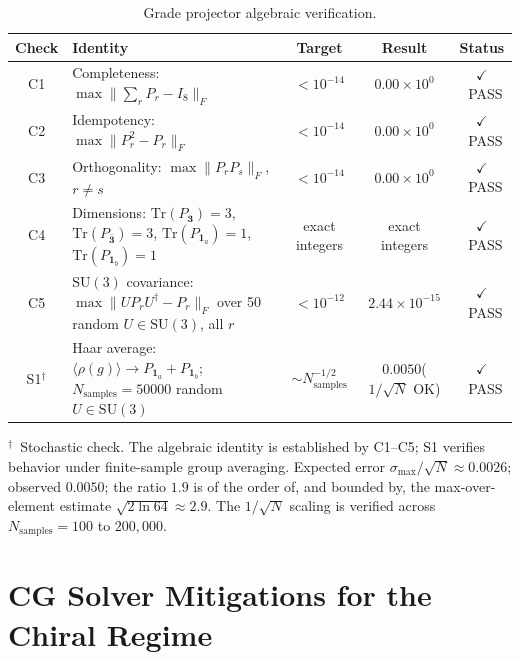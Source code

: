 \documentclass[12pt]{article}
\theoremstyle{definition}
\theoremstyle{remark}
\newcommand{\su}{\mathrm{SU}}           %
\newcommand{\tr}{\mathrm{Tr}}           %
\begin{document}
	\setcounter{table}{0}
	\begin{table}[htbp]
		\centering
		\caption{Grade projector algebraic verification.}
		\label{tab:verif-C1}
		\begin{tabular}{@{} c p{6.3cm} c c c @{}}
			\toprule
			\textbf{Check}
			& \textbf{Identity}
			& \textbf{Target}
			& \textbf{Result}
			& \textbf{Status} \\
			\midrule
			C1
			& Completeness:\; $\max\bigl\|\sum_r P_r - I_8\bigr\|_F$
			& $<10^{-14}$
			& $0.00\times10^{0}$
			& $\checkmark$\ PASS \\[4pt]
			C2
			& Idempotency:\; $\max\|P_r^2 - P_r\|_F$
			& $<10^{-14}$
			& $0.00\times10^{0}$
			& $\checkmark$\ PASS \\[4pt]
			C3
			& Orthogonality:\; $\max\|P_r P_s\|_F$,\; $r\neq s$
			& $<10^{-14}$
			& $0.00\times10^{0}$
			& $\checkmark$\ PASS \\[4pt]
			C4
			& Dimensions: $\tr(P_{\mathbf{3}})=3$,\; $\tr(P_{\bar{\mathbf{3}}})=3$,\;
			$\tr(P_{\mathbf{1}_a})=1$,\; $\tr(P_{\mathbf{1}_b})=1$
			& exact integers
			& exact integers
			& $\checkmark$\ PASS \\[4pt]
			C5
			& $\su(3)$ covariance: $\max\|U P_r U^\dagger - P_r\|_F$
			over 50 random $U\in\su(3)$, all $r$
			& $<10^{-12}$
			& $2.44\times10^{-15}$
			& $\checkmark$\ PASS \\[4pt]
			S1$^\dagger$
			& Haar average:
			$\langle\rho(g)\rangle \to P_{\mathbf{1}_a}+P_{\mathbf{1}_b}$;\;
			$N_{\mathrm{samples}}=50000$ random $U\in\su(3)$
			& ${\sim}N_{\mathrm{samples}}^{-1/2}$
			& $0.0050$\newline($1/\!\sqrt{N}$ OK)
			& $\checkmark$\ PASS \\
			\bottomrule
		\end{tabular}
		
		\smallskip
		\noindent\footnotesize
		$^\dagger$\ Stochastic check.  The algebraic identity is established by
		C1--C5; S1 verifies behavior under finite-sample group averaging.  Expected
		error $\sigma_{\max}/\sqrt{N}\approx0.0026$; observed $0.0050$; the ratio
		$1.9$ is of the order of, and bounded by, the max-over-element estimate
		$\sqrt{2\ln 64}\approx 2.9$.
		The $1/\sqrt{N}$ scaling is verified across $N_{\mathrm{samples}}=100$ to
		$200{,}000$.
	\end{table}
	
	\section{CG Solver Mitigations for the Chiral Regime}
	\label{app:D}
	
\end{document}
